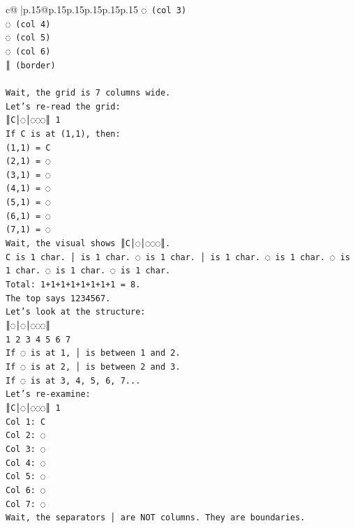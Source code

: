 \documentclass{article}
\begin{document}
{\begin{supertabular}{c@{$\;$}|p{.15\linewidth}@{}p{.15\linewidth}p{.15\linewidth}p{.15\linewidth}p{.15\linewidth}p{.15\linewidth}}
{{{\texttt{◌ (col 3)} \\
\texttt{◌ (col 4)} \\
\texttt{◌ (col 5)} \\
\texttt{◌ (col 6)} \\
\texttt{║ (border)} \\
\\ 
\texttt{Wait, the grid is 7 columns wide.} \\
\texttt{Let's re{-}read the grid:} \\
\texttt{║C│◌│◌◌◌║ 1} \\
\texttt{If C is at (1,1), then:} \\
\texttt{(1,1) = C} \\
\texttt{(2,1) = ◌} \\
\texttt{(3,1) = ◌} \\
\texttt{(4,1) = ◌} \\
\texttt{(5,1) = ◌} \\
\texttt{(6,1) = ◌} \\
\texttt{(7,1) = ◌} \\
\texttt{Wait, the visual shows ║C│◌│◌◌◌║.} \\
\texttt{C is 1 char. │ is 1 char. ◌ is 1 char. │ is 1 char. ◌ is 1 char. ◌ is 1 char. ◌ is 1 char. ◌ is 1 char.} \\
\texttt{Total: 1+1+1+1+1+1+1+1 = 8.} \\
\texttt{The top says 1234567.} \\
\texttt{Let's look at the structure:} \\
\texttt{║◌│◌│◌◌◌║} \\
\texttt{1 2 3 4 5 6 7} \\
\texttt{If ◌ is at 1, │ is between 1 and 2.} \\
\texttt{If ◌ is at 2, │ is between 2 and 3.} \\
\texttt{If ◌ is at 3, 4, 5, 6, 7...} \\
\texttt{Let's re{-}examine:} \\
\texttt{║C│◌│◌◌◌║ 1} \\
\texttt{Col 1: C} \\
\texttt{Col 2: ◌} \\
\texttt{Col 3: ◌} \\
\texttt{Col 4: ◌} \\
\texttt{Col 5: ◌} \\
\texttt{Col 6: ◌} \\
\texttt{Col 7: ◌} \\
\texttt{Wait, the separators │ are NOT columns. They are boundaries.} \\
}}}
\end{supertabular}}
\end{document}
